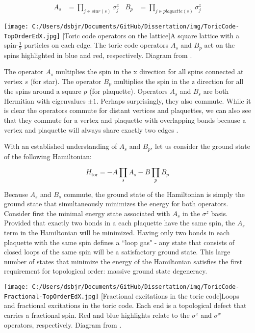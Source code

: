 \begin{align*}
A_s&=\prod_{j \in star(s)} \sigma^{x}_{j} 		& B_{p}&=\prod_{j \in plaquette(s)} \sigma^{z}_{j}
\end{align*}

\begin{centering}
\texttt{[image: C:/Users/dsbjr/Documents/GitHub/Dissertation/img/ToricCode-TopOrderEdX.jpg]}
  \captionsetup{width=0.9\textwidth}
  [Toric code operators on the lattice]{A square lattice with a spin-$\frac{1}{2}$ particles on each edge. The toric code operators $A_{s}$ and $B_{p}$ act on the spins highlighted in blue and red, respectively. Diagram from \cite{topOrderEdX}.}
  \label{fig:toricCode1}
\end{centering}

The operator $A_{s}$ multiplies the spin in the x direction for all spins connected at vertex $s$ (for star). The operator $B_{p}$ multiplies the spin in the z direction for all the spins around a square $p$ (for plaquette). Operators $A_{s}$ and $B_{s}$ are both Hermitian with eigenvalues $\pm 1$. Perhaps surprisingly, they also commute. While it is clear the operators commute for distant vertices and plaquettes, we can also see that they commute for a vertex and plaquette with overlapping bonds because a vertex and plaquette will always share exactly two edges \cite{Kitaev2003}.

With an established understanding of $A_{s}$ and $B_{p}$, let us consider the ground state of the following Hamiltonian:

\begin{equation}
H_{\text{tor}} = -A \prod_{s} A_{s} - B \prod_{p} B_{p}
\end{equation}

Because $A_{s}$ and $B_{s}$ commute, the ground state of the Hamiltonian is simply the ground state that simultaneously minimizes the energy for both operators. Consider first the minimal energy state associated with $A_{s}$ in the $\sigma^{z}$ basis. Provided that exactly two bonds in a each plaquette have the same spin, the $A_{s}$ term in the Hamiltonian will be minimized. Having only two bonds in each plaquette with the same spin defines a ``loop gas" - any state that consists of closed loops of the same spin will be a satisfactory ground state. This large number of states that minimize the energy of the Hamiltonian satisfies the first requirement for topological order: massive ground state degeneracy.

\begin{centering}
\texttt{[image: C:/Users/dsbjr/Documents/GitHub/Dissertation/img/ToricCode-Fractional-TopOrderEdX.jpg]}
  \captionsetup{width=0.75\textwidth}
  [Fractional excitations in the toric code]{Loops and fractional excitations in the toric code. Each end is a topological defect that carries a fractional spin. Red and blue highlights relate to the $\sigma^{z}$ and $\sigma^{x}$ operators, respectively. Diagram from \cite{topOrderEdX}.}
  \label{fig:toricCode2}
\end{centering}

